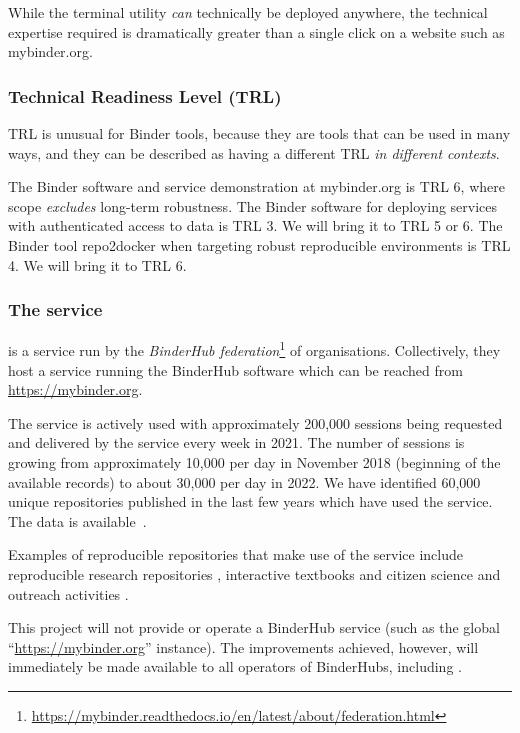 While the \repotodocker{} terminal utility \emph{can} technically be deployed anywhere,
the technical expertise required is dramatically greater than a single click on a website such as mybinder.org.

\subsubsection{Technical Readiness Level (TRL)}

TRL is unusual for Binder tools, because they are tools that can be used in many ways,
and they can be described as having a different TRL \emph{in different contexts}.

The Binder software and service demonstration at mybinder.org is TRL 6,
where scope \emph{excludes} long-term robustness.
The Binder software for deploying services with authenticated access to data is TRL 3.
We will bring it to TRL 5 or 6.
The Binder tool repo2docker when targeting robust reproducible environments is TRL 4.
We will bring it to TRL 6.

\subsubsection{The \mybinder{} service}\label{sec:mybinder}

\emph{\mybinder{}} is a service run by the \emph{BinderHub
  federation}\footnote{\url{https://mybinder.readthedocs.io/en/latest/about/federation.html}}
of organisations. Collectively, they host a service running the BinderHub software
which can be reached from \url{https://mybinder.org}.

The service is actively used with approximately 200,000 sessions being
requested and delivered by the \mybinder{} service every week in 2021. The number
of sessions is growing from approximately 10,000 per day in November 2018
(beginning of the available records) to about 30,000 per day in 2022. We have
identified 60,000 unique repositories published in the last few years which have
used the \mybinder{} service. The data is available~\cite{mybinder-archive}.

Examples of reproducible repositories that make use of the \mybinder service
include reproducible research repositories
\cite{GitHubRepoExampleAlbert2016,Beg2021}, interactive textbooks
\cite{Fangohr2022,Zeller2022} and citizen science and outreach activities
\cite{ligo-open-science,OSCOVIDA2022}.

This \TheProject{} project will not provide or operate a BinderHub service (such as the global
``\url{https://mybinder.org}'' instance). The improvements achieved, however, will immediately
be made available to all operators of BinderHubs, including \mybinder{}.


